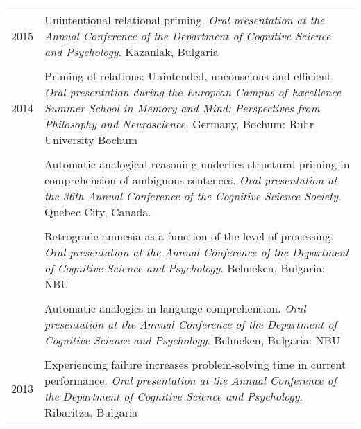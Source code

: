 \documentclass[letterpaper]{article}
\begin{document}
\begin{longtable}{p{0.7cm}p{15cm}}
 &\\
2015 & Unintentional relational priming. {\it Oral presentation at the Annual Conference of the Department of Cognitive Science and Psychology}. Kazanlak, Bulgaria\\[6pt]
&\\
2014 &  Priming of relations: Unintended, unconscious and efficient. {\it Oral presentation during the European Campus of Excellence Summer School in Memory and Mind: Perspectives from Philosophy and Neuroscience.} Germany, Bochum: Ruhr University Bochum\\[6pt]
 &\\
& Automatic analogical reasoning underlies structural priming in comprehension of ambiguous sentences. {\it Oral presentation at the 36th Annual Conference of the Cognitive Science Society}. Quebec City, Canada.\\[6pt]
 &\\
& Retrograde amnesia as a function of the level of processing. {\it  Oral presentation at the Annual Conference of the Department of Cognitive Science and Psychology}. Belmeken, Bulgaria: NBU\\[6pt]
 &\\
& Automatic analogies in language comprehension. {\it  Oral presentation at the Annual Conference of the Department of Cognitive Science and Psychology}. Belmeken, Bulgaria: NBU\\[6pt]
 &\\
2013 & Experiencing failure increases problem-solving time in current performance. {\it Oral presentation at the Annual Conference of the Department of Cognitive Science and Psychology}. Ribaritza, Bulgaria\\[6pt]

\end{longtable}
\end{document}
